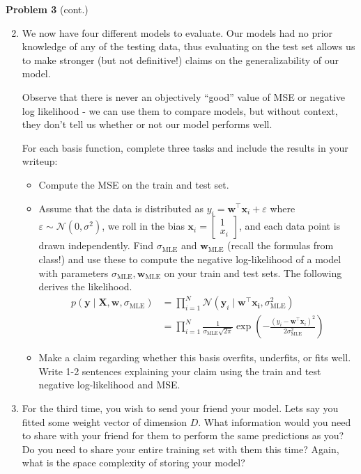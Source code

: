 \documentclass[submit]{harvardml}
\begin{document}
\newpage
\begin{framed}
\noindent\textbf{Problem 3} (cont.)\\
\begin{enumerate}
\setcounter{enumi}{1}
\item 

We now have four different models to evaluate. Our models had no
prior knowledge of any of the testing data, thus evaluating on
the test set allows us to make stronger (but not definitive!) 
claims on the generalizability of our model.

Observe that there is never an objectively ``good'' value of MSE or negative log likelihood - we can use them to compare models, but without context, they don't tell us whether or not our model performs well.

For each basis function, complete three tasks and include the
results in your writeup: 
\begin{itemize}
\item Compute the MSE on the train and test set. 

\item Assume that the data is distributed as 
$y_i = \mathbf{w}^\top \mathbf{x}_i + \varepsilon$ where 
$\varepsilon \sim \mathcal{N}(0, \sigma^2)$, we roll in the bias 
$\mathbf{x}_i = \begin{bmatrix} 1 \\ x_i \end{bmatrix}$, and each data point
is drawn independently. Find $\sigma_{\text{MLE}}$ and $\mathbf{w}_{\text{MLE}}$ (recall the formulas from class!) and use these to 
compute the negative log-likelihood of a model with parameters $\sigma_{\text{MLE}}, \mathbf{w}_{\text{MLE}}$ on your train and test sets. 
The following derives the likelihood.
\begin{align*} p(\mathbf{y}\mid \mathbf{X},\mathbf{w},\sigma_{\text{MLE}}) 
&= \prod_{i=1}^N \mathcal{N}(\mathbf{y}_i \mid \mathbf{w}^\top\mathbf{x_i}, \sigma_{\text{MLE}}^2) \\
&= \prod_{i=1}^N \frac{1}{\sigma_{\text{MLE}}\sqrt{2\pi}}\exp\left(-\frac{(y_i - \mathbf{w}^\top \mathbf{x}_i)^2}{2\sigma_{\text{MLE}}^2}\right)
\end{align*}

\item Make a claim regarding whether this basis overfits, 
underfits, or fits well. Write 1-2 sentences explaining your 
claim using the train and test negative log-likelihood and MSE.


\end{itemize}
\item For the third time, you wish to send your friend your model. Lets say you fitted some weight vector of dimension $D$. What information would you need to share with your friend for them to perform the same predictions as you? Do you need to share your entire training set with them this time? Again, what is the space complexity of storing your model?


\end{enumerate}
\end{framed}
\end{document}
